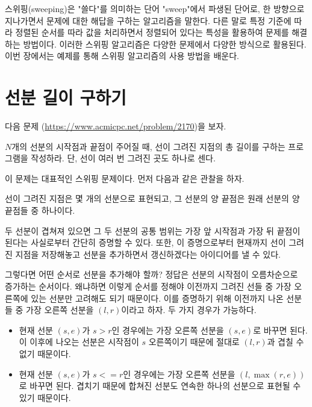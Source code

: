 스위핑(sweeping)은 "쓸다"를 의미하는 단어 "sweep"에서 파생된 단어로, 한 방향으로 지나가면서 문제에 대한 해답을 구하는 알고리즘을 말한다. 다른 말로 특정 기준에 따라 정렬된 순서를 따라 값을 처리하면서 정렬되어 있다는 특성을 활용하여 문제를 해결하는 방법이다. 이러한 스위핑 알고리즘은 다양한 문제에서 다양한 방식으로 활용된다. 이번 장에서는 예제를 통해 스위핑 알고리즘의 사용 방법을 배운다.

\section{선분 길이 구하기}
다음 문제 (\url{https://www.acmicpc.net/problem/2170})을 보자.
\begin{example} \label{ex: sweeping}
    $N$개의 선분의 시작점과 끝점이 주어질 때, 선이 그려진 지점의 총 길이를 구하는 프로그램을 작성하라. 단, 선이 여러 번 그려진 곳도 하나로 센다.
\end{example}

이 문제는 대표적인 스위핑 문제이다. 먼저 다음과 같은 관찰을 하자.

\begin{obs}
    선이 그려진 지점은 몇 개의 선분으로 표현되고, 그 선분의 양 끝점은 원래 선분의 양 끝점들 중 하나이다.
\end{obs}

두 선분이 겹쳐져 있으면 그 두 선분의 공통 범위는 가장 앞 시작점과 가장 뒤 끝점이 된다는 사실로부터 간단히 증명할 수 있다. 또한, 이 증명으로부터 현재까지 선이 그려진 지점을 저장해놓고 선분을 추가하면서 갱신하겠다는 아이디어를 낼 수 있다.

그렇다면 어떤 순서로 선분을 추가해야 할까? 정답은 선분의 시작점이 오름차순으로 증가하는 순서이다. 왜냐하면 이렇게 순서를 정해야 이전까지 그려진 선들 중 가장 오른쪽에 있는 선분만 고려해도 되기 때문이다. 이를 증명하기 위해 이전까지 나온 선분들 중 가장 오른쪽 선분을 $(l, r)$이라고 하자. 두 가지 경우가 가능하다.
\begin{itemize}
    \item 현재 선분 $(s, e)$가 $s>r$인 경우에는 가장 오른쪽 선분을 $(s, e)$로 바꾸면 된다. 이 이후에 나오는 선분은 시작점이 $s$ 오른쪽이기 때문에 절대로 $(l, r)$과 겹칠 수 없기 때문이다.
    \item 현재 선분 $(s, e)$가 $s<=r$인 경우에는 가장 오른쪽 선분을 $(l, \max(r, e))$로 바꾸면 된다. 겹치기 때문에 합쳐진 선분도 연속한 하나의 선분으로 표현될 수 있기 때문이다.
\end{itemize}

